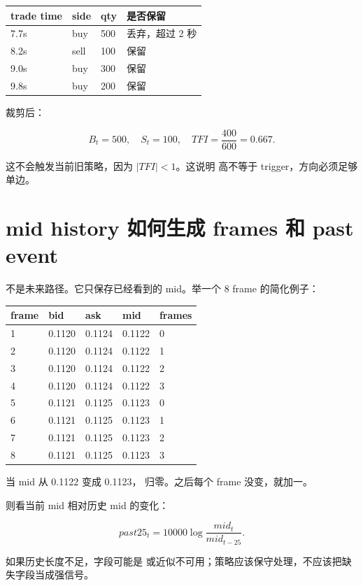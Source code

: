 \begin{longtable}{p{}p{}p{}p{}}
\toprule
trade time & side & qty & 是否保留 \\
\midrule
7.7s & buy & 500 & 丢弃，超过 2 秒 \\
8.2s & sell & 100 & 保留 \\
9.0s & buy & 300 & 保留 \\
9.8s & buy & 200 & 保留 \\
\bottomrule
\end{longtable}

裁剪后：

\[
B_t=500,\quad S_t=100,\quad TFI=\frac{400}{600}=0.667.
\]

这不会触发当前旧策略，因为 \(|TFI|<1\)。这说明  高不等于 trigger，方向必须足够单边。

\section{mid history 如何生成 frames 和 past event}

 不是未来路径。它只保存已经看到的 mid。举一个 8 frame 的简化例子：

\begin{longtable}{p{}p{}p{}p{}p{}}
\toprule
frame & bid & ask & mid & frames \\
\midrule
1 & 0.1120 & 0.1124 & 0.1122 & 0 \\
2 & 0.1120 & 0.1124 & 0.1122 & 1 \\
3 & 0.1120 & 0.1124 & 0.1122 & 2 \\
4 & 0.1120 & 0.1124 & 0.1122 & 3 \\
5 & 0.1121 & 0.1125 & 0.1123 & 0 \\
6 & 0.1121 & 0.1125 & 0.1123 & 1 \\
7 & 0.1121 & 0.1125 & 0.1123 & 2 \\
8 & 0.1121 & 0.1125 & 0.1123 & 3 \\
\bottomrule
\end{longtable}

当 mid 从 0.1122 变成 0.1123， 归零。之后每个 frame 没变，就加一。

 则看当前 mid 相对历史 mid 的变化：

\[
past25_t=10000\log\frac{mid_t}{mid_{t-25}}.
\]

如果历史长度不足，字段可能是  或近似不可用；策略应该保守处理，不应该把缺失字段当成强信号。

